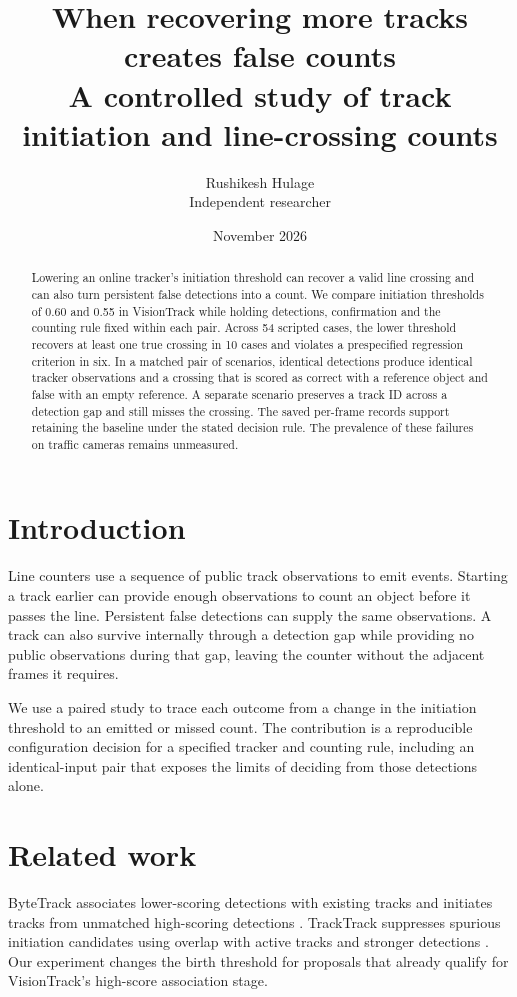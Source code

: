 \documentclass[11pt]{article}
\title{When recovering more tracks creates false counts\\[4pt]
\large A controlled study of track initiation and line-crossing counts}
\author{Rushikesh Hulage\\[2pt]\normalsize Independent researcher}
\date{November 2026}
\begin{document}
\maketitle
\begin{abstract}
Lowering an online tracker's initiation threshold can recover a valid line crossing and can also turn persistent false detections into a count. We compare initiation thresholds of 0.60 and 0.55 in VisionTrack while holding detections, confirmation and the counting rule fixed within each pair. Across 54 scripted cases, the lower threshold recovers at least one true crossing in 10 cases and violates a prespecified regression criterion in six. In a matched pair of scenarios, identical detections produce identical tracker observations and a crossing that is scored as correct with a reference object and false with an empty reference. A separate scenario preserves a track ID across a detection gap and still misses the crossing. The saved per-frame records support retaining the baseline under the stated decision rule. The prevalence of these failures on traffic cameras remains unmeasured.
\end{abstract}

\section{Introduction}
Line counters use a sequence of public track observations to emit events. Starting a track earlier can provide enough observations to count an object before it passes the line. Persistent false detections can supply the same observations. A track can also survive internally through a detection gap while providing no public observations during that gap, leaving the counter without the adjacent frames it requires.

We use a paired study to trace each outcome from a change in the initiation threshold to an emitted or missed count. The contribution is a reproducible configuration decision for a specified tracker and counting rule, including an identical-input pair that exposes the limits of deciding from those detections alone.

\section{Related work}
ByteTrack associates lower-scoring detections with existing tracks and initiates tracks from unmatched high-scoring detections \cite{bytetrack}. TrackTrack suppresses spurious initiation candidates using overlap with active tracks and stronger detections \cite{tracktrack}. Our experiment changes the birth threshold for proposals that already qualify for VisionTrack's high-score association stage.
\end{document}
